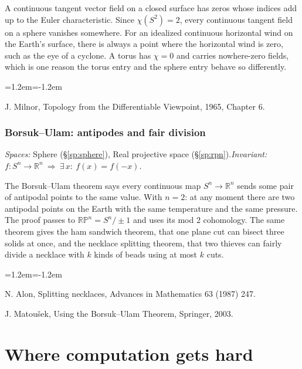 \documentclass[11pt,twoside]{book}
\begin{document}
A continuous tangent vector field on a closed surface has zeros whose indices add up to the Euler characteristic. Since $\chi(S^2)=2$, every continuous tangent field on a sphere vanishes somewhere. For an idealized continuous horizontal wind on the Earth's surface, there is always a point where the horizontal wind is zero, such as the eye of a cyclone. A torus has $\chi=0$ and carries nowhere-zero fields, which is one reason the torus entry and the sphere entry behave so differently.
\begin{list}{}{\leftmargin=1.2em\itemindent=-1.2em\itemsep=0pt}\small \item J. Milnor, Topology from the Differentiable Viewpoint, 1965, Chapter 6.\end{list}
\subsection{Borsuk–Ulam: antipodes and fair division}\label{app:app-borsuk}
\noindent\textit{Spaces:} Sphere (\S\ref{sp:sphere}), Real projective space (\S\ref{sp:rpn}).\enspace\textit{Invariant:} $f:S^n\to\mathbb{R}^n\ \Rightarrow\ \exists\,x:\ f(x)=f(-x)$.

The Borsuk–Ulam theorem says every continuous map $S^n\to\mathbb{R}^n$ sends some pair of antipodal points to the same value. With $n=2$: at any moment there are two antipodal points on the Earth with the same temperature and the same pressure. The proof passes to $\mathbb{RP}^n=S^n/\pm1$ and uses its mod 2 cohomology. The same theorem gives the ham sandwich theorem, that one plane cut can bisect three solids at once, and the necklace splitting theorem, that two thieves can fairly divide a necklace with $k$ kinds of beads using at most $k$ cuts.
\begin{list}{}{\leftmargin=1.2em\itemindent=-1.2em\itemsep=0pt}\small \item N. Alon, Splitting necklaces, Advances in Mathematics 63 (1987) 247.\item J. Matoušek, Using the Borsuk–Ulam Theorem, Springer, 2003.\end{list}
\chapter{Where computation gets hard}
\end{document}
